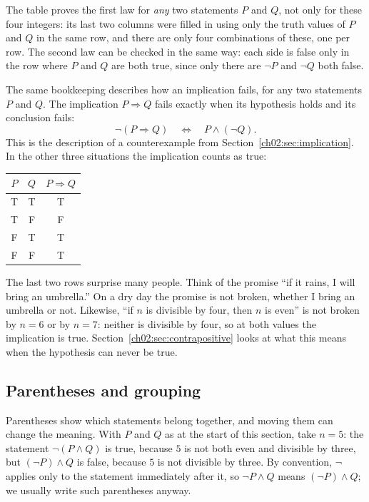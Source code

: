 The table proves the first law for \emph{any} two statements $P$ and $Q$, not only for these four integers: its last two columns were filled in using only the truth values of $P$ and $Q$ in the same row, and there are only four combinations of these, one per row. The second law can be checked in the same way: each side is false only in the row where $P$ and $Q$ are both true, since only there are $\neg P$ and $\neg Q$ both false.

The same bookkeeping describes how an implication fails, for any two statements $P$ and $Q$. The implication $P\Rightarrow Q$ fails exactly when its hypothesis holds and its conclusion fails:
\[
\neg(P\Rightarrow Q)\quad\Longleftrightarrow\quad P\land(\neg Q).
\]
This is the description of a counterexample from Section~\ref{ch02:sec:implication}. In the other three situations the implication counts as true:
\begin{center}
\begin{tabular}{@{}ccc@{}}
\toprule
$P$ & $Q$ & $P\Rightarrow Q$\\
\midrule
T & T & T\\
T & F & F\\
F & T & T\\
F & F & T\\
\bottomrule
\end{tabular}
\end{center}
The last two rows surprise many people. Think of the promise ``if it rains, I will bring an umbrella.'' On a dry day the promise is not broken, whether I bring an umbrella or not. Likewise, ``if $n$ is divisible by four, then $n$ is even'' is not broken by $n=6$ or by $n=7$: neither is divisible by four, so at both values the implication is true. Section~\ref{ch02:sec:contrapositive} looks at what this means when the hypothesis can never be true.

\subsection*{Parentheses and grouping}
Parentheses show which statements belong together, and moving them can change the meaning. With $P$ and $Q$ as at the start of this section, take $n=5$: the statement $\neg(P\land Q)$ is true, because $5$ is not both even and divisible by three, but $(\neg P)\land Q$ is false, because $5$ is not divisible by three. By convention, $\neg$ applies only to the statement immediately after it, so $\neg P\land Q$ means $(\neg P)\land Q$; we usually write such parentheses anyway.
